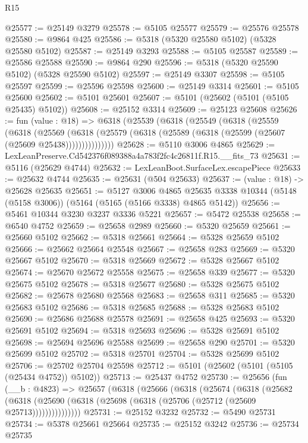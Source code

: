 \begin{lexlean}{R15}
\begin{coremodule}
{{{{{{{{{{{@25577 := @25149 @3279
@25578 := @5105 @25577
@25579 := @25576 @25578
@25580 := @9864 @425
@25586 := @5318 (@5320 @25580 @5102) (@5328 @25580 @5102)
@25587 := @25149 @3293
@25588 := @5105 @25587
@25589 := @25586 @25588
@25590 := @9864 @290
@25596 := @5318 (@5320 @25590 @5102) (@5328 @25590 @5102)
@25597 := @25149 @3307
@25598 := @5105 @25597
@25599 := @25596 @25598
@25600 := @25149 @3314
@25601 := @5105 @25600
@25602 := @5101 @25601
@25607 := @5101 (@25602 (@5101 (@5105 @25435) @5102))
@25608 := @25152 @3314
@25609 := @25123 @25608
@25626 := fun (value : @18) =>
  @6318
    (@25539
      (@6318
        (@25549
          (@6318
            (@25559
              (@6318
                (@25569
                  (@6318 (@25579 (@6318 (@25589 (@6318 (@25599 (@25607 (@25609 @25438)))))))))))))))
@25628 := @5110 @3006 @4865
@25629 := LexLeanPreserve.Cd542376f089388a4a783f2fc4c26811f.R15.__fits_73
@25631 := @5116 (@25629 @4744)
@25632 := LexLeanBoot.SurfaceLex.escapePiece
@25633 := @25632 @4744
@25635 := @25631 (@504 @25633)
@25637 := (value : @18) -> @25628 @25635
@25651 := @5127
    @3006
    @4865
    @25635
    @3338
    @10344
    (@5148 (@5158 @3006))
    (@5164 (@5165 (@5166 @3338) @4865 @5142))
@25656 := @5461 @10344 @3230 @3237 @3336 @5221
@25657 := @5472 @25538
@25658 := @6540 @4752
@25659 := @25658 @2989
@25660 := @5320 @25659
@25661 := @25660 @5102
@25662 := @5318 @25661
@25664 := @5328 @25659 @5102
@25666 := @25662 @25664 @25548
@25667 := @25658 @283
@25669 := @5320 @25667 @5102
@25670 := @5318 @25669
@25672 := @5328 @25667 @5102
@25674 := @25670 @25672 @25558
@25675 := @25658 @339
@25677 := @5320 @25675 @5102
@25678 := @5318 @25677
@25680 := @5328 @25675 @5102
@25682 := @25678 @25680 @25568
@25683 := @25658 @311
@25685 := @5320 @25683 @5102
@25686 := @5318 @25685
@25688 := @5328 @25683 @5102
@25690 := @25686 @25688 @25578
@25691 := @25658 @425
@25693 := @5320 @25691 @5102
@25694 := @5318 @25693
@25696 := @5328 @25691 @5102
@25698 := @25694 @25696 @25588
@25699 := @25658 @290
@25701 := @5320 @25699 @5102
@25702 := @5318 @25701
@25704 := @5328 @25699 @5102
@25706 := @25702 @25704 @25598
@25712 := @5101 (@25602 (@5101 (@5105 (@25434 @4752)) @5102))
@25713 := @25437 @4752
@25730 := @25656
    (fun (__b : @4823) =>
    @25657
      (@6318
        (@25666
          (@6318
            (@25674
              (@6318
                (@25682
                  (@6318 (@25690 (@6318 (@25698 (@6318 (@25706 (@25712 (@25609 @25713)))))))))))))))
@25731 := @25152 @3232
@25732 := @5490 @25731
@25734 := @5378 @25661 @25664
@25735 := @25152 @3242
@25736 := @25734 @25735
}}}}}}}}}}}
\end{coremodule}
\end{lexlean}

